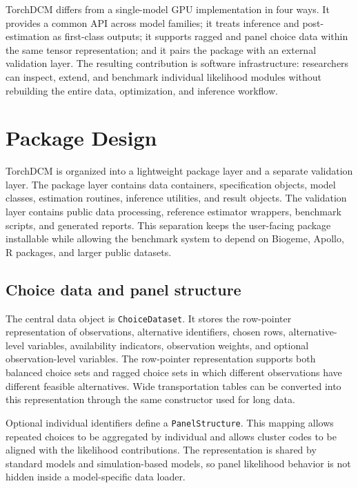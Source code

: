 \documentclass[11pt]{article}
\begin{document}
TorchDCM differs from a single-model GPU implementation in four ways. It
provides a common API across model families; it treats inference and
post-estimation as first-class outputs; it supports ragged and panel choice data
within the same tensor representation; and it pairs the package with an
external validation layer. The resulting contribution is software
infrastructure: researchers can inspect, extend, and benchmark individual
likelihood modules without rebuilding the entire data, optimization, and
inference workflow.

\section{Package Design}
\label{sec:design}

TorchDCM is organized into a lightweight package layer and a separate
validation layer. The package layer contains data containers, specification
objects, model classes, estimation routines, inference utilities, and result
objects. The validation layer contains public data processing, reference
estimator wrappers, benchmark scripts, and generated reports. This separation
keeps the user-facing package installable while allowing the benchmark system to
depend on Biogeme, Apollo, R packages, and larger public datasets.

\subsection{Choice data and panel structure}

The central data object is \texttt{ChoiceDataset}. It stores the row-pointer
representation of observations, alternative identifiers, chosen rows,
alternative-level variables, availability indicators, observation weights, and
optional observation-level variables. The row-pointer representation supports
both balanced choice sets and ragged choice sets in which different observations
have different feasible alternatives. Wide transportation tables can be
converted into this representation through the same constructor used for long
data.

Optional individual identifiers define a \texttt{PanelStructure}. This mapping
allows repeated choices to be aggregated by individual and allows cluster codes
to be aligned with the likelihood contributions. The representation is shared by
standard models and simulation-based models, so panel likelihood behavior is not
hidden inside a model-specific data loader.
\end{document}
